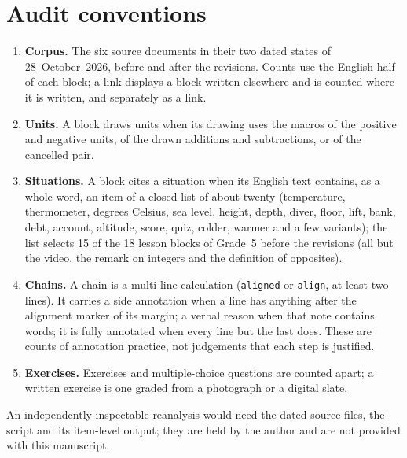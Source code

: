 \documentclass[11pt,a4paper]{article}
\theoremstyle{definition}
\begin{document}
\section{Audit conventions}\label{app:audit}

\begin{enumerate}[leftmargin=*]
\item \textbf{Corpus.} The six source documents in their two dated states of 28~October~2026, before and after the revisions. Counts use the English half of each block; a link displays a block written elsewhere and is counted where it is written, and separately as a link.
\item \textbf{Units.} A block draws units when its drawing uses the macros of the positive and negative units, of the drawn additions and subtractions, or of the cancelled pair.
\item \textbf{Situations.} A block cites a situation when its English text contains, as a whole word, an item of a closed list of about twenty (temperature, thermometer, degrees Celsius, sea level, height, depth, diver, floor, lift, bank, debt, account, altitude, score, quiz, colder, warmer and a few variants); the list selects 15 of the 18 lesson blocks of Grade~5 before the revisions (all but the video, the remark on integers and the definition of opposites).
\item \textbf{Chains.} A chain is a multi-line calculation (\texttt{aligned} or \texttt{align}, at least two lines). It carries a side annotation when a line has anything after the alignment marker of its margin; a verbal reason when that note contains words; it is fully annotated when every line but the last does. These are counts of annotation practice, not judgements that each step is justified.
\item \textbf{Exercises.} Exercises and multiple-choice questions are counted apart; a written exercise is one graded from a photograph or a digital slate.
\end{enumerate}
An independently inspectable reanalysis would need the dated source files, the script and its item-level output; they are held by the author and are not provided with this manuscript.
\end{document}
